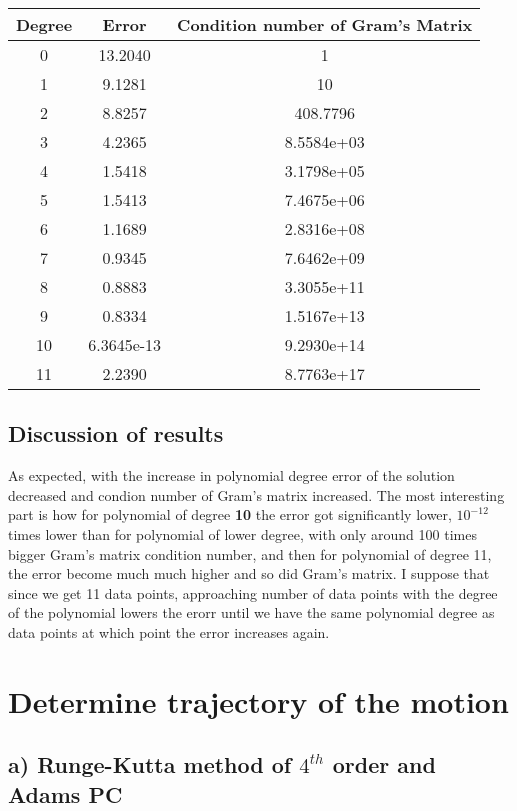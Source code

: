\documentclass[12pt]{report}
\begin{document}
\begin{center}
  \begin{tabular}{| c | c | c |}
\hline

Degree & Error & Condition number of Gram's Matrix \\
\hline
0& 13.2040& 1\\
\hline
1& 9.1281& 10\\
\hline
2& 8.8257&   408.7796\\
\hline
3& 4.2365& 8.5584e+03\\
\hline
4& 1.5418&  3.1798e+05\\
\hline
5& 1.5413& 7.4675e+06\\
\hline
6& 1.1689& 2.8316e+08\\
\hline
7& 0.9345& 7.6462e+09\\
\hline
8& 0.8883& 3.3055e+11\\
\hline
9& 0.8334& 1.5167e+13\\
\hline
10& 6.3645e-13& 9.2930e+14\\
\hline
11 & 2.2390 & 8.7763e+17 \\
\hline
  \end{tabular}
\end{center}

\section{Discussion of results}
As expected, with the increase in polynomial degree error of the solution decreased and condion number of Gram's matrix increased. The most interesting part is how for polynomial of degree \textbf{10} the error got significantly lower, $10^{-12}$ times lower than for polynomial of lower degree, with only around 100 times bigger Gram's matrix condition number, and then for polynomial of degree 11, the error become much much higher and so did Gram's matrix. I suppose that since we get 11 data points, approaching number of data points with the degree of the polynomial lowers the erorr until we have the same polynomial degree as data points at which point the error increases again.






\chapter{Determine trajectory of the motion}


\section{a) Runge-Kutta method of $4^{th}$ order and Adams PC}
\end{document}
